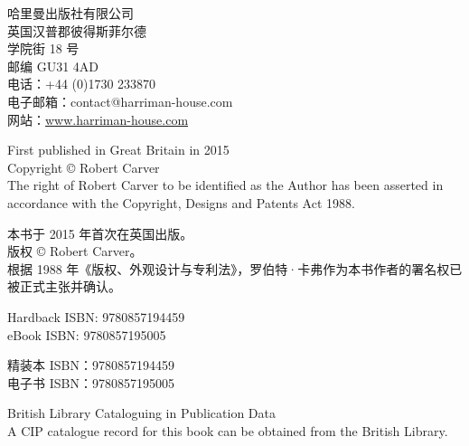 \vspace{0.65em} \begin{chineseblock}哈里曼出版社有限公司\\
英国汉普郡彼得斯菲尔德\\
学院街 18 号\\
邮编 GU31 4AD\\
电话：+44 (0)1730 233870\\
电子邮箱：contact@harriman-house.com\\
网站：\url{www.harriman-house.com} \par \end{chineseblock}

\vspace{0.8em} \begin{englishblock} First published in Great Britain in 2015\\
Copyright \copyright{} Robert Carver\\
The right of Robert Carver to be identified as the Author has been asserted in accordance with the Copyright, Designs and Patents Act 1988. \par \end{englishblock}

\vspace{0.65em} \begin{chineseblock}本书于 2015 年首次在英国出版。\\
版权 \copyright{} Robert Carver。\\
根据 1988 年《版权、外观设计与专利法》，罗伯特·卡弗作为本书作者的署名权已被正式主张并确认。 \par \end{chineseblock}

\vspace{0.8em} \begin{englishblock} Hardback ISBN: 9780857194459\\
eBook ISBN: 9780857195005 \par \end{englishblock}

\vspace{0.65em} \begin{chineseblock}精装本 ISBN：9780857194459\\
电子书 ISBN：9780857195005 \par \end{chineseblock}

\vspace{1.0em} \begin{englishblock} British Library Cataloguing in Publication Data\\
A CIP catalogue record for this book can be obtained from the British Library. \par \end{englishblock}

